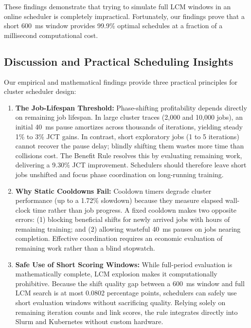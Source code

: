 \documentclass[conference]{IEEEtran}
\begin{document}
These findings demonstrate that trying to simulate full LCM windows in an online scheduler is completely impractical. Fortunately, our findings prove that a short 600~ms window provides 99.9\% optimal schedules at a fraction of a millisecond computational cost.

\subsection{Discussion and Practical Scheduling Insights}
\label{sec:discussion}

Our empirical and mathematical findings provide three practical principles for cluster scheduler design:

\begin{enumerate}
    \item \textbf{The Job-Lifespan Threshold:} Phase-shifting profitability depends directly on remaining job lifespan. In large cluster traces (2,000 and 10,000 jobs), an initial 40~ms pause amortizes across thousands of iterations, yielding steady 1\% to 3\% JCT gains. In contrast, short exploratory jobs (1 to 5 iterations) cannot recover the pause delay; blindly shifting them wastes more time than collisions cost. The Benefit Rule resolves this by evaluating remaining work, delivering a 9.30\% JCT improvement. Schedulers should therefore leave short jobs unshifted and focus phase coordination on long-running training.
    \item \textbf{Why Static Cooldowns Fail:} Cooldown timers degrade cluster performance (up to a 1.72\% slowdown) because they measure elapsed wall-clock time rather than job progress. A fixed cooldown makes two opposite errors: (1) blocking beneficial shifts for newly arrived jobs with hours of remaining training; and (2) allowing wasteful 40~ms pauses on jobs nearing completion. Effective coordination requires an economic evaluation of remaining work rather than a blind stopwatch.
    \item \textbf{Safe Use of Short Scoring Windows:} While full-period evaluation is mathematically complete, LCM explosion makes it computationally prohibitive. Because the shift quality gap between a 600~ms window and full LCM search is at most 0.0802 percentage points, schedulers can safely use short evaluation windows without sacrificing quality. Relying solely on remaining iteration counts and link scores, the rule integrates directly into Slurm and Kubernetes without custom hardware.
\end{enumerate}
\end{document}

